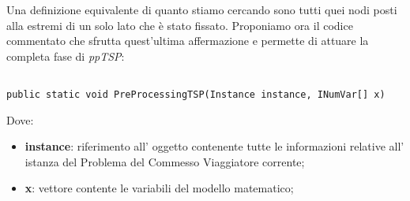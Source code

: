 \documentclass[11pt]{article}
\begin{document}
Una definizione equivalente di quanto stiamo cercando sono tutti quei nodi posti alla estremi di un solo lato che è stato fissato. Proponiamo ora il codice commentato che sfrutta quest'ultima affermazione e permette di attuare la completa fase di \textit{ppTSP}:

\begin{lstlisting}

public static void PreProcessingTSP(Instance instance, INumVar[] x)

\end{lstlisting}

Dove:

\begin{itemize}
    \item \textbf{instance}: riferimento all' oggetto contenente tutte le informazioni relative all' istanza del Problema del Commesso Viaggiatore corrente;
    \item \textbf{x}: vettore contente le variabili del modello matematico;
\end{itemize}
\end{document}
